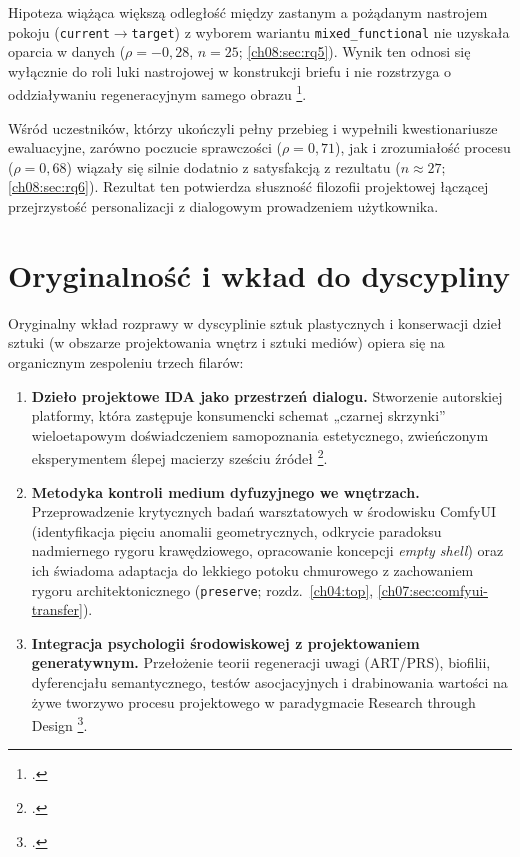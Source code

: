 \begin{description}[style=nextline]
  \item[\RQ{5} --- rozpiętość nastroju regeneracyjnego PRS a wariant funkcjonalny]
  Hipoteza  wiążąca większą odległość między zastanym a pożądanym nastrojem pokoju (\texttt{current}$\rightarrow$\texttt{target}) z wyborem wariantu \texttt{mixed\_functional} nie uzyskała oparcia w danych ($\rho = -0{,}28$, $n=25$; \cref{ch08:sec:rq5}). Wynik ten odnosi się wyłącznie do roli luki nastrojowej w konstrukcji briefu i nie rozstrzyga o oddziaływaniu regeneracyjnym samego obrazu \footcite{kaplan1995restorative}.

  \item[\RQ{6} --- poczucie sprawczości, zrozumiałość procesu i satysfakcja]
  Wśród uczestników, którzy ukończyli pełny przebieg i wypełnili kwestionariusze ewaluacyjne, zarówno poczucie sprawczości ($\rho = 0{,}71$), jak i zrozumiałość procesu ($\rho = 0{,}68$) wiązały się silnie dodatnio z satysfakcją z rezultatu ($n \approx 27$; \cref{ch08:sec:rq6}). Rezultat ten potwierdza słuszność filozofii projektowej łączącej przejrzystość personalizacji z dialogowym prowadzeniem użytkownika.
\end{description}

\section{Oryginalność i wkład do dyscypliny}
\label{ch10:sec:wklad}

Oryginalny wkład rozprawy w dyscyplinie sztuk plastycznych i konserwacji dzieł sztuki (w obszarze projektowania wnętrz i sztuki mediów) opiera się na organicznym zespoleniu trzech filarów:

\begin{enumerate}
  \item \textbf{Dzieło projektowe IDA jako przestrzeń dialogu.} Stworzenie autorskiej platformy, która zastępuje konsumencki schemat „czarnej skrzynki” wieloetapowym doświadczeniem samopoznania estetycznego, zwieńczonym eksperymentem ślepej macierzy sześciu źródeł \footcite{idaPlatform2026,zimmerman2007rtd}.
  \item \textbf{Metodyka kontroli medium dyfuzyjnego we wnętrzach.} Przeprowadzenie krytycznych badań warsztatowych w środowisku ComfyUI (identyfikacja pięciu anomalii geometrycznych, odkrycie paradoksu nadmiernego rygoru krawędziowego, opracowanie koncepcji \emph{empty shell}) oraz ich świadoma adaptacja do lekkiego potoku chmurowego z zachowaniem rygoru architektonicznego (\texttt{preserve}; rozdz.~\ref{ch04:top}, \ref{ch07:sec:comfyui-transfer}).
  \item \textbf{Integracja psychologii środowiskowej z projektowaniem generatywnym.} Przełożenie teorii regeneracji uwagi (ART/PRS), biofilii, dyferencjału semantycznego, testów asocjacyjnych i drabinowania wartości na żywe tworzywo procesu projektowego w paradygmacie Research through Design \footcite{frayling1993research}.
\end{enumerate}

